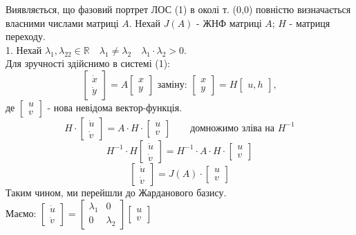 Виявляється, що фазовий портрет ЛОС (1) в околі т. (0,0) повністю визначається власними числами матриці $A$. Нехай $J(A)$ - ЖНФ матриці $A$; $H$ - матриця переходу.\\

1. Нехай $\lambda_1 , \lambda_22 \in \mathbb{R} \quad \lambda_1 \neq \lambda_2 \quad \lambda_1 \cdot \lambda_2 > 0.$\\ Для зручності здійснимо в системі (1):
$$
\begin{bmatrix}
 \dot{x}\\
 \dot{y}
\end{bmatrix} = A \begin{bmatrix}
 x \\
 y
\end{bmatrix} \text{ заміну: } \begin{bmatrix}
 x\\
 y
\end{bmatrix} = H \begin{bmatrix}
 u, h
\end{bmatrix},
$$
де $\begin{bmatrix}
 u \\
 v
\end{bmatrix}$ - нова невідома вектор-функція.
$$
H \cdot \begin{bmatrix}
 \dot{u}\\
 \dot{v}
\end{bmatrix} = A \cdot H \cdot \begin{bmatrix}
 u \\
 v
\end{bmatrix} \qquad \text{домножимо зліва на } H^{-1}
$$
$$
H^{-1} \cdot H \begin{bmatrix}
\dot{u}\\
\dot{v}
\end{bmatrix}  =H^{-1} \cdot A \cdot H \cdot \begin{bmatrix}
 u \\
 v
\end{bmatrix}
$$
$$
\begin{bmatrix}
\dot{u}\\
\dot{v}
\end{bmatrix}  =J(A) \cdot \begin{bmatrix}
 u \\
 v
\end{bmatrix}
$$
Таким чином, ми перейшли до Жарданового базису.\\
Маємо: $ \begin{bmatrix}
\dot{u}\\
\dot{v}
\end{bmatrix} = \begin{bmatrix}
 \lambda_1 & 0 \\
 0 & \lambda_2
\end{bmatrix} \begin{bmatrix}
 u \\
 v
\end{bmatrix}$

